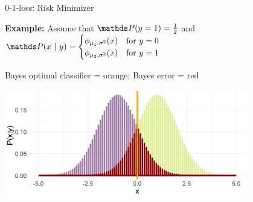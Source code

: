 \documentclass[11pt,compress,t,notes=noshow, xcolor=table]{beamer}
\begin{document}
\begin{vbframe}{0-1-loss: Risk Minimizer}





  

\framebreak 

\textbf{Example: } Assume that $\P(y = 1) = \frac{1}{2}$ and $
\P(x ~|~ y) = \begin{cases}
\phi_{\mu_1, \sigma^2}(x) & \text{for } y = 0\\ 
\phi_{\mu_2, \sigma^2}(x) & \text{for } y = 1
\end{cases}$

\vfill


Bayes optimal classifier = orange; Bayes error = red 

\vfill

\begin{center}
\includegraphics[width = 0.8\textwidth]{figure/bayes_error_5.png} \\
\end{center}



\end{vbframe}

\endlecture
\end{document}
